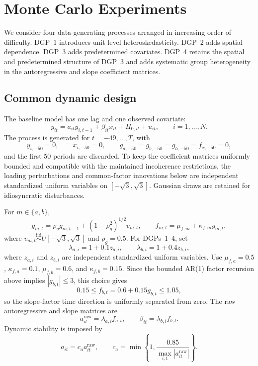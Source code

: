 \documentclass[11pt]{article}
\numberwithin{equation}{section}
\theoremstyle{remark}
\begin{document}
\section{Monte Carlo Experiments}
\label{sec:MC}

We consider four data-generating processes arranged in increasing order of difficulty. DGP~1 introduces unit-level heteroskedasticity. DGP~2 adds spatial dependence. DGP~3 adds predetermined covariates. DGP~4 retains the spatial and predetermined structure of DGP~3 and adds systematic group heterogeneity in the autoregressive and slope coefficient matrices.

\subsection{Common dynamic design}

The baseline model has one lag and one observed covariate:
\begin{equation}
\label{eq:sim_dgp}
y_{it}
=
a_{it}y_{i,t-1}
+
\beta_{it}x_{it}
+
H_{0,it}
+
u_{it},
\qquad
i=1,\ldots,N.
\end{equation}
The process is generated for $t=-49,\ldots,T$, with
$$
y_{i,-50}=0,
\qquad
x_{i,-50}=0,
\qquad
g_{a,-50}=g_{b,-50}=g_{h,-50}=f_{x,-50}=0,
$$
and the first 50 periods are discarded. To keep the coefficient matrices uniformly bounded and compatible with the maintained incoherence restrictions, the loading perturbations and common-factor innovations below are independent standardized uniform variables on $[-\sqrt 3,\sqrt 3]$. Gaussian draws are retained for idiosyncratic disturbances.

For $m\in\{a,b\}$,
$$
g_{m,t}
=
\rho_g g_{m,t-1}
+
(1-\rho_g^2)^{1/2}v_{m,t},
\qquad
f_{m,t}=\mu_{f,m}+\kappa_{f,m}g_{m,t},
$$
where $v_{m,t}\stackrel{\mathrm{iid}}{\sim}U[-\sqrt 3,\sqrt 3]$ and $\rho_g=0.5$. For DGPs~1--4, set
$$
\lambda_{a,i}=1+0.1z_{a,i},
\qquad
\lambda_{b,i}=1+0.4z_{b,i},
$$
where $z_{a,i}$ and $z_{b,i}$ are independent standardized uniform variables. Use $\mu_{f,a}=0.5$, $\kappa_{f,a}=0.1$, $\mu_{f,b}=0.6$, and $\kappa_{f,b}=0.15$. Since the bounded AR(1) factor recursion above implies $|g_{b,t}|\le 3$, this choice gives
$$
0.15
\le
f_{b,t}
=
0.6+0.15g_{b,t}
\le
1.05,
$$
so the slope-factor time direction is uniformly separated from zero. The raw autoregressive and slope matrices are
$$
a_{it}^{\mathrm{raw}}=\lambda_{a,i}f_{a,t},
\qquad
\beta_{it}=\lambda_{b,i}f_{b,t}.
$$
Dynamic stability is imposed by
$$
a_{it}=c_a a_{it}^{\mathrm{raw}},
\qquad
c_a=\min\left\{1,\frac{0.85}{\max_{i,t}|a_{it}^{\mathrm{raw}}|}\right\}.
$$
\end{document}
